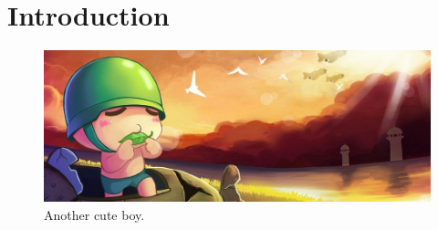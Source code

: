 
\section{Introduction}
\label{sec:p2-introduction}

\begin{figure}[t]
	\centering
	\includegraphics[width=0.95\linewidth]{paper2/figures/fig2}
	\caption{\small
		Another cute boy.
	}
	\label{fig:p2-teaser}
\end{figure}




